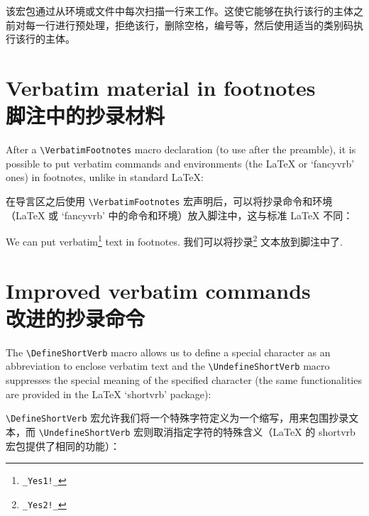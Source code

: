 \documentclass[twoside]{article}
\newcommand\FVrbPackage{`\textsf{fancyvrb}'}
\newcommand\cs[1]{\texttt{\textbackslash#1}}
\begin{document}
该宏包通过从环境或文件中每次扫描一行来工作。这使它能够在执行该行的主体之前对每一行进行预处理，拒绝该行，删除空格，编号等，然后使用适当的类别码执行该行的主体。



\section{Verbatim material in footnotes\\脚注中的抄录材料}


After a \cs{VerbatimFootnotes} macro declaration (to use after the
preamble), it is possible to put verbatim commands and environments
(the \LaTeX{} or \FVrbPackage{} ones) in footnotes, unlike in standard
\LaTeX:

在导言区之后使用 \cs{VerbatimFootnotes} 宏声明后，可以将抄录命令和环境（\LaTeX{} 或 \FVrbPackage{} 中的命令和环境）放入脚注中，这与标准 \LaTeX{} 不同：

\begin{Example}
  \VerbatimFootnotes
  We can put verbatim\footnote{\verb+_Yes1!_+} text in footnotes.
  我们可以将抄录\footnote{\verb+_Yes2!_+} 文本放到脚注中了.
\end{Example}

\section{Improved verbatim commands\\改进的抄录命令}

The \cs{DefineShortVerb} macro allows us to define a special character as
an abbreviation to enclose verbatim text and the \cs{UndefineShortVerb}
macro suppresses the special meaning of the specified character (the same
functionalities are provided in the \LaTeX{} `\textsf{shortvrb}' package):

\cs{DefineShortVerb} 宏允许我们将一个特殊字符定义为一个缩写，用来包围抄录文本，而 \cs{UndefineShortVerb} 宏则取消指定字符的特殊含义（\LaTeX{} 的 \textsf{shortvrb} 宏包提供了相同的功能）：
%
\end{document}
